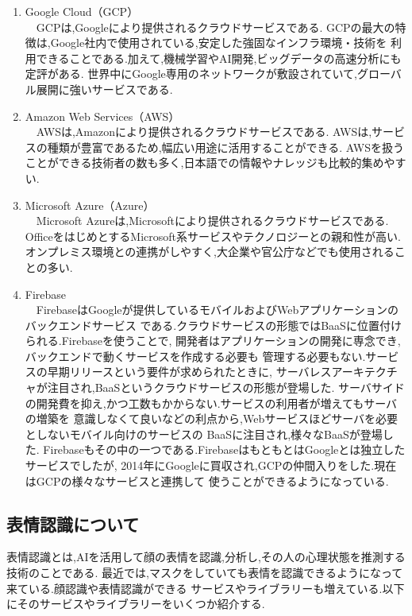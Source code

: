 \begin{enumerate}
  \item Google Cloud（GCP） \\
  　GCPは,Googleにより提供されるクラウドサービスである.
  GCPの最大の特徴は,Google社内で使用されている,安定した強固なインフラ環境・技術を
  利用できることである.加えて,機械学習やAI開発,ビッグデータの高速分析にも定評がある.
  世界中にGoogle専用のネットワークが敷設されていて,グローバル展開に強いサービスである.  \\

  \item Amazon Web Services（AWS） \\
  　AWSは,Amazonにより提供されるクラウドサービスである.
  AWSは,サービスの種類が豊富であるため,幅広い用途に活用することができる.
  AWSを扱うことができる技術者の数も多く,日本語での情報やナレッジも比較的集めやすい.\\

  \item Microsoft Azure（Azure） \\
  　Microsoft Azureは,Microsoftにより提供されるクラウドサービスである. 
  OfficeをはじめとするMicrosoft系サービスやテクノロジーとの親和性が高い.
  オンプレミス環境との連携がしやすく,大企業や官公庁などでも使用されることの多い.\\

  \item  Firebase \\
  　FirebaseはGoogleが提供しているモバイルおよびWebアプリケーションのバックエンドサービス
  である.クラウドサービスの形態ではBaaSに位置付けられる.Firebaseを使うことで,
  開発者はアプリケーションの開発に専念でき,バックエンドで動くサービスを作成する必要も
  管理する必要もない.サービスの早期リリースという要件が求められたときに,
  サーバレスアーキテクチャが注目され,BaaSというクラウドサービスの形態が登場した.
  サーバサイドの開発費を抑え,かつ工数もかからない.サービスの利用者が増えてもサーバの増築を
  意識しなくて良いなどの利点から,Webサービスほどサーバを必要としないモバイル向けのサービスの
  BaaSに注目され,様々なBaaSが登場した.
  Firebaseもその中の一つである.FirebaseはもともとはGoogleとは独立したサービスでしたが,
  2014年にGoogleに買収され,GCPの仲間入りをした.現在はGCPの様々なサービスと連携して
  使うことができるようになっている.
\end{enumerate}

\subsection{表情認識について}
表情認識とは,AIを活用して顔の表情を認識,分析し,その人の心理状態を推測する技術のことである.
最近では,マスクをしていても表情を認識できるようになって来ている.顔認識や表情認識ができる
サービスやライブラリーも増えている.以下にそのサービスやライブラリーをいくつか紹介する.

